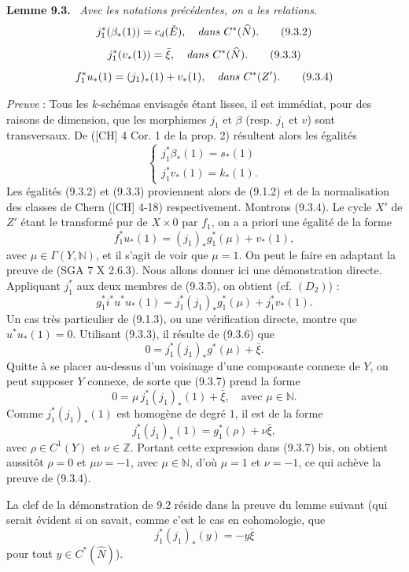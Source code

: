 \documentclass[11pt]{article}
\newenvironment{statement}[1]{\par\medskip\noindent\textbf{#1.}\ }{\par\medskip}
\begin{document}
\begin{statement}{Lemme 9.3}
\emph{Avec les notations précédentes, on a les relations}.
\[
j_1^*(\beta_*(1))=c_d(\check E),\quad\text{\emph{dans} }C^*(\widehat N).
\tag{9.3.2}
\]
\[
j_1^*(v_*(1))=\bar\xi,\quad\text{\emph{dans} }C^*(\widehat N).
\tag{9.3.3}
\]
\[
f_1^*u_*(1)=(j_1)_*(1)+v_*(1),\quad\text{\emph{dans} }C^*(Z').
\tag{9.3.4}
\]
\end{statement}

\emph{Preuve} : Tous les $k$-schémas envisagés étant lisses, il est immédiat, pour des raisons de dimension, que les morphismes $j_1$ et $\beta$ (resp. $j_1$ et $v$) sont transversaux. De ([CH] 4 Cor. 1 de la prop. 2) résultent alors les égalités
\[
\begin{cases}
j_1^*\beta_*(1)=s_*(1)\\
j_1^*v_*(1)=k_*(1).
\end{cases}
\]
Les égalités (9.3.2) et (9.3.3) proviennent alors de (9.1.2) et de la normalisation des classes de Chern ([CH] 4-18) respectivement. Montrons (9.3.4). Le cycle $X'$ de $Z'$ étant le transformé pur de $X\times0$ par $f_1$, on a a priori une égalité de la forme
\[
f_1^*u_*(1)=(j_1)_*g_1^*(\mu)+v_*(1),
\tag{9.3.5}
\]
avec $\mu\in\Gamma(Y,\mathbb N)$, et il s'agit de voir que $\mu=1$. On peut le faire en adaptant la preuve de (SGA 7 X 2.6.3). Nous allons donner ici une démonstration directe. Appliquant $j_1^*$ aux deux membres de (9.3.5), on obtient (cf. $(D_2)$) :
\[
g_1^*i^*u^*u_*(1)=j_1^*(j_1)_*g_1^*(\mu)+j_1^*v_*(1).
\tag{9.3.6}
\]
Un cas très particulier de (9.1.3), ou une vérification directe, montre que $u^*u_*(1)=0$. Utilisant (9.3.3), il résulte de (9.3.6) que
\[
0=j_1^*(j_1)_*g^*(\mu)+\bar\xi.
\tag{9.3.7}
\]
Quitte à se placer au-dessus d'un voisinage d'une composante connexe de $Y$, on peut supposer $Y$ connexe, de sorte que (9.3.7) prend la forme
\[
0=\mu\,j_1^*(j_1)_*(1)+\bar\xi,\quad\text{avec }\mu\in\mathbb N.
\tag*{(9.3.7) bis}
\]
Comme $j_1^*(j_1)_*(1)$ est homogène de degré $1$, il est de la forme
\[
j_1^*(j_1)_*(1)=g_1^*(\rho)+\nu\bar\xi,
\]
avec $\rho\in C^1(Y)$ et $\nu\in\mathbb Z$. Portant cette expression dans (9.3.7) bis, on obtient aussitôt $\rho=0$ et $\mu\nu=-1$, avec $\mu\in\mathbb N$, d'où $\mu=1$ et $\nu=-1$, ce qui achève la preuve de (9.3.4).

La clef de la démonstration de 9.2 réside dans la preuve du lemme suivant (qui serait évident si on savait, comme c'est le cas en cohomologie, que
\[
j_1^*(j_1)_*(y)=-y\bar\xi
\]
pour tout $y\in C^*(\widehat N)$).
\end{document}
